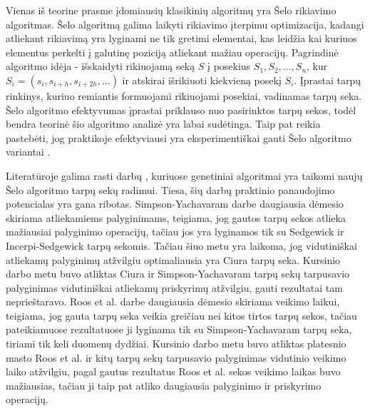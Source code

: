\documentclass{VUMIFInfBakalaurinis}
\begin{document}
Vienas iš teorine prasme įdomiausių klasikinių algoritmų yra Šelo rikiavimo algoritmas.
Šelo algoritmą galima laikyti rikiavimo įterpimu optimizacija, kadangi atliekant rikiavimą yra lyginami ne tik gretimi elementai,
kas leidžia kai kuriuos elementus perkelti į galutinę poziciją atliekant mažiau operacijų.
Pagrindinė algoritmo idėja - išskaidyti rikiuojamą seką $S$ į posekius $S_1, S_2, ..., S_n$, kur
$S_i = (s_i, s_{i+h}, s_{i+2h}, ...)$ ir atskirai išrikiuoti kiekvieną posekį $S_i$.
Įprastai tarpų rinkinys, kuriuo remiantis formuojami rikiuojami posekiai, vadinamas tarpų seka.
Šelo algoritmo efektyvumas įprastai priklauso nuo pasirinktos tarpų sekos, todėl bendra teorinė šio algoritmo analizė yra labai sudėtinga.
Taip pat reikia pastebėti, jog praktikoje efektyviausi yra eksperimentiškai gauti Šelo algoritmo variantai \cite{ciura2001best,tokuda1992}.

Literatūroje galima rasti darbų \cite{roos2002genetic,simpson1999faster}, kuriuose genetiniai algoritmai yra taikomi naujų Šelo algoritmo tarpų sekų radimui.
Tiesa, šių darbų praktinio panaudojimo potencialas yra gana ribotas.
Simpson-Yachavaram darbe daugiausia dėmesio skiriama atliekamiems palyginimams, teigiama, jog gautos tarpų sekos atlieka mažiausiai palyginimo operacijų,
tačiau jos yra lyginamos tik su Sedgewick ir Incerpi-Sedgewick tarpų sekomis.
Tačiau šiuo metu yra laikoma, jog vidutiniškai atliekamų palyginimų atžvilgiu optimaliausia yra Ciura \cite{ciura2001best} tarpų seka.
Kursinio darbo metu buvo atliktas Ciura ir Simpson-Yachavaram tarpų sekų tarpusavio palyginimas vidutiniškai atliekamų priskyrimų atžvilgiu, gauti rezultatai tam neprieštaravo.
Roos et al. darbe daugiausia dėmesio skiriama veikimo laikui, teigiama, jog gauta tarpų seka veikia greičiau nei kitos tirtos tarpų sekos, tačiau
pateikiamuose rezultatuose ji lyginama tik su Simpson-Yachavaram tarpų seka, tiriami tik keli duomenų dydžiai.
Kursinio darbo metu buvo atliktas platesnio masto Roos et al. ir kitų tarpų sekų tarpusavio palyginimas vidutinio veikimo laiko atžvilgiu,
pagal gautus rezultatus Roos et al. sekos veikimo laikas buvo mažiausias, tačiau ji taip pat atliko daugiausia palyginimo ir priskyrimo operacijų.




\end{document}
